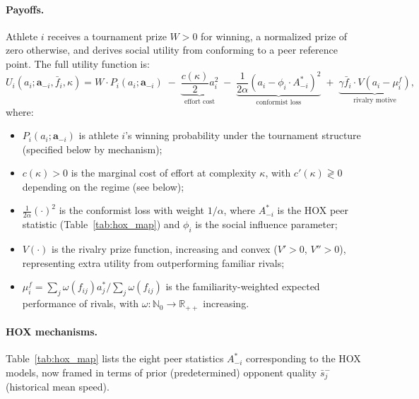 \documentclass[12pt]{article}
\theoremstyle{definition}
\theoremstyle{remark}
\begin{document}
\paragraph{Payoffs.}
Athlete $i$ receives a tournament prize $W > 0$ for winning,
a normalized prize of zero otherwise, and derives social utility from
conforming to a peer reference point.
The full utility function is:
\begin{equation}
U_i(a_i; \mathbf{a}_{-i}, \bar{f}_i, \kappa)
= W\cdot P_i(a_i;\mathbf{a}_{-i})
  \;-\; \underbrace{\frac{c(\kappa)}{2} a_i^2}_{\text{effort cost}}
  \;-\; \underbrace{\frac{1}{2\alpha}(a_i - \phi_i \cdot A_{-i}^*)^2}_{\text{conformist loss}}
  \;+\; \underbrace{\gamma \bar{f}_i \cdot V\!\left(a_i - \mu_i^f\right)}_{\text{rivalry motive}},
\label{eq:utility_full}
\end{equation}
where:
\begin{itemize}[noitemsep]
\item $P_i(a_i;\mathbf{a}_{-i})$ is athlete $i$'s winning probability under
      the tournament structure (specified below by mechanism);
\item $c(\kappa) > 0$ is the marginal cost of effort at complexity $\kappa$,
      with $c'(\kappa) \gtrless 0$ depending on the regime (see below);
\item $\frac{1}{2\alpha}(\cdot)^2$ is the conformist loss with weight $1/\alpha$,
      where $A_{-i}^*$ is the HOX peer statistic (Table~\ref{tab:hox_map}) and
      $\phi_i$ is the social influence parameter;
\item $V(\cdot)$ is the rivalry prize function, increasing and convex
      ($V' > 0$, $V'' > 0$), representing extra utility from outperforming
      familiar rivals;
\item $\mu_i^f = \sum_j \omega(f_{ij}) a_j^* / \sum_j \omega(f_{ij})$ is the
      familiarity-weighted expected performance of rivals, with $\omega:\mathbb{N}_0
      \to \mathbb{R}_{++}$ increasing.
\end{itemize}

\paragraph{HOX mechanisms.}
Table~\ref{tab:hox_map} lists the eight peer statistics $A_{-i}^*$ corresponding
to the HOX models, now framed in terms of prior (predetermined) opponent quality
$\bar{s}_j^-$ (historical mean speed).
\end{document}
